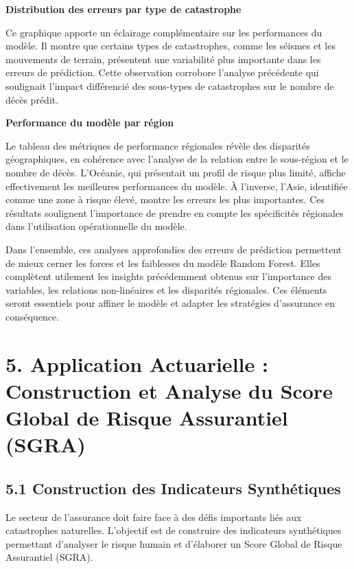 \documentclass[
]{article}
\begin{document}
\textbf{Distribution des erreurs par type de catastrophe}

Ce graphique apporte un éclairage complémentaire sur les performances du
modèle. Il montre que certains types de catastrophes, comme les séismes
et les mouvements de terrain, présentent une variabilité plus importante
dans les erreurs de prédiction. Cette observation corrobore l'analyse
précédente qui soulignait l'impact différencié des sous-types de
catastrophes sur le nombre de décès prédit.

\textbf{Performance du modèle par région}

Le tableau des métriques de performance régionales révèle des disparités
géographiques, en cohérence avec l'analyse de la relation entre le
sous-région et le nombre de décès. L'Océanie, qui présentait un profil
de risque plus limité, affiche effectivement les meilleures performances
du modèle. À l'inverse, l'Asie, identifiée comme une zone à risque
élevé, montre les erreurs les plus importantes. Ces résultats soulignent
l'importance de prendre en compte les spécificités régionales dans
l'utilisation opérationnelle du modèle.

Dans l'ensemble, ces analyses approfondies des erreurs de prédiction
permettent de mieux cerner les forces et les faiblesses du modèle Random
Forest. Elles complètent utilement les insights précédemment obtenus sur
l'importance des variables, les relations non-linéaires et les
disparités régionales. Ces éléments seront essentiels pour affiner le
modèle et adapter les stratégies d'assurance en conséquence.

\section{5. Application Actuarielle : Construction et Analyse du Score
Global de Risque Assurantiel
(SGRA)}\label{application-actuarielle-construction-et-analyse-du-score-global-de-risque-assurantiel-sgra}

\subsection{5.1 Construction des Indicateurs
Synthétiques}\label{construction-des-indicateurs-synthuxe9tiques}

Le secteur de l'assurance doit faire face à des défis importants liés
aux catastrophes naturelles. L'objectif est de construire des
indicateurs synthétiques permettant d'analyser le risque humain et
d'élaborer un Score Global de Risque Assurantiel (SGRA).
\end{document}
